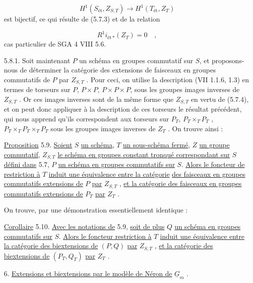 \begin{equation*}
H^1(S_{\text{ét}}, Z_{S,T}) \longrightarrow H^1(T_{\text{ét}}, Z_T)
\end{equation*}
est bijectif, ce qui résulte de (5.7.3) et de la relation

\begin{equation*}
R^1 i_{\text{ét}\,*}(Z_T) = 0 \quad ,
\end{equation*}
cas particulier de SGA 4 VIII 5.6.

5.8.1. Soit maintenant $P$ un schéma en groupes commutatif sur $S$, et proposons-nous de déterminer la catégorie des extensions de faisceaux en groupes commutatifs de $P$ par $Z_{S,T}$ . Pour ceci, on utilise la description (VII 1.1.6, 1.3) en termes de torseurs sur $P$, $P \times P$, $P \times P \times P$, sous les groupes images inverses de $Z_{S,T}$ . Or ces images inverses sont de la même forme que $Z_{S,T}$ en vertu de (5.7.4), et on peut donc appliquer à la description de ces torseurs le résultat précédent, qui nous apprend qu'ils correspondent aux torseurs sur $P_T$, $P_T \times_T P_T$ , $P_T \times_T P_T \times_T P_T$ sous les groupes images inverses de $Z_T$ . On trouve ainsi :

\underline{Proposition} 5.9. \underline{Soient} $S$ \underline{un schéma}, $T$ \underline{un sous-schéma fermé}, $Z$ \underline{un groupe commutatif}, $Z_{S,T}$ \underline{le schéma en groupes constant tronqué correspondant sur} $S$ \underline{défini dans} 5.7, $P$ \underline{un schéma en groupes commutatifs sur} $S$. \underline{Alors le foncteur de restriction à} $T$ \underline{induit une équivalence entre la catégorie}
\underline{des faisceaux en groupes commutatifs extensions de} $P$ \underline{par} $Z_{S,T}$ , \underline{et la catégorie des faisceaux en groupes commutatifs extensions de} $P_T$ \underline{par} $Z_T$ .

On trouve, par une démonstration essentiellement identique :

\underline{Corollaire} 5.10. \underline{Avec les notations de} 5.9, \underline{soit de plus} $Q$ \underline{un schéma en groupes commutatifs sur} $S$. \underline{Alors le foncteur restriction à} $T$ \underline{induit une équivalence entre la catégorie des biextensions de} $(P,Q)$ \underline{par} $Z_{S,T}$ , \underline{et la catégorie des biextensions de} $(P_T,Q_T)$ \underline{par} $Z_T$ .

6. \underline{Extensions et biextensions par le modèle de Néron de} $\underline{G}_m$ .

